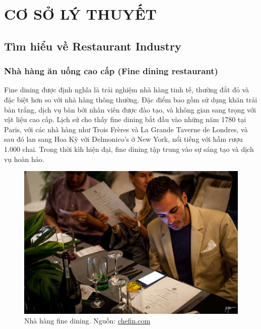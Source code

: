 \section{CƠ SỞ LÝ THUYẾT}
\subsection{Tìm hiểu về Restaurant Industry}

\subsubsection{Nhà hàng ăn uống cao cấp (Fine dining restaurant)}
Fine dining được định nghĩa là trải nghiệm nhà hàng tinh tế, thường đắt đỏ và đặc biệt hơn so với nhà hàng thông thường. Đặc điểm bao gồm sử dụng khăn trải bàn trắng, dịch vụ bàn bởi nhân viên được đào tạo, và không gian sang trọng với vật liệu cao cấp. Lịch sử cho thấy fine dining bắt đầu vào những năm 1780 tại Paris, với các nhà hàng như Trois Frères và La Grande Taverne de Londres, và sau đó lan sang Hoa Kỳ với Delmonico's ở New York, nổi tiếng với hầm rượu 1.000 chai. Trong thời kìh hiện đại, fine dining tập trung vào sự sáng tạo và dịch vụ hoàn hảo.\\


\begin{figure}[H]
    \centering
    \includegraphics[width=15cm]{Images/fine-dining.jpg}
    \vspace{0.5cm}
    \caption{Nhà hàng fine dining. Nguồn: \href{https://chefin.com/blog/the-past-and-future-of-fine-dining/}{chefin.com}}
    \label{fig:my_label}
\end{figure}


